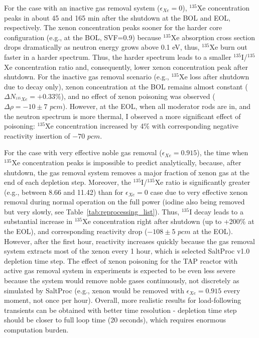 For the case with an inactive gas removal system ($\epsilon_{Xe}=0$), 
$^{135}$Xe 
concentration peaks in about 45 and 165 min after the shutdown at the 
\gls{BOL} and \gls{EOL}, respectively. The xenon concentration peaks 
sooner for the harder core configuration (e.g., at the \gls{BOL}, SVF=0.9) 
because $^{135}$Xe absorption cross section drops dramatically as neutron 
energy grows above 0.1 eV, thus, $^{135}$Xe burn out faster in a harder 
spectrum. Thus, the harder spectrum leads to a smaller $^{135}$I/$^{135}$Xe 
concentration ratio and, consequently, lower xenon concentration peak after 
shutdown. For the inactive gas removal scenario (e.g., $^{135}$Xe loss after 
shutdown due to decay only), xenon concentration at the \gls{BOL} remains 
almost constant ($\Delta N_{^{135}Xe}=+0.33$\%), and no effect of xenon 
poisoning was observed ($\Delta\rho=-10\pm7$ $pcm$). However, at the 
\gls{EOL}, when all moderator rods are in, and the neutron spectrum is more 
thermal, I observed a more significant effect of poisoning: $^{135}$Xe 
concentration increased by 4\% with corresponding negative reactivity 
insertion of $-70$ $pcm$. 

For the case with very effective noble gas removal ($\epsilon_{Xe}=0.915$), 
the time when $^{135}$Xe concentration peaks is impossible to predict 
analytically, because, after shutdown, the gas removal system removes a major 
fraction of xenon gas at the end of each depletion step. Moreover, the 
$^{135}$I/$^{135}$Xe ratio is significantly greater (e.g., between 8.66 and 
11.42) than for $\epsilon_{Xe}=0$ case due to very effective xenon removal 
during normal operation on the full power (iodine also being removed but very 
slowly, see Table~\ref{tab:reprocessing_list}). Thus, $^{135}$I decay leads to 
a substantial increase in $^{135}$Xe concentration right after shutdown (up to 
+200\% at the \gls{EOL}), and corresponding reactivity drop ($-108\pm5$ $pcm$ 
at the \gls{EOL}). However, after the first hour, reactivity increases quickly 
because the gas removal system extracts most of the xenon every 1 hour, which 
is selected SaltProc v1.0 depletion time step. The effect of xenon poisoning 
for the \gls{TAP} reactor with active gas removal system in experiments is 
expected to be even less severe because the system would remove noble gases 
continuously, not discretely as simulated by SaltProc (e.g., xenon would be 
removed with $\epsilon_{Xe}=0.915$ every moment, not once per hour). Overall, 
more realistic results for load-following transients can be obtained with 
better time resolution - depletion time step should be closer to full loop 
time (20 seconds), which requires enormous computation burden.

